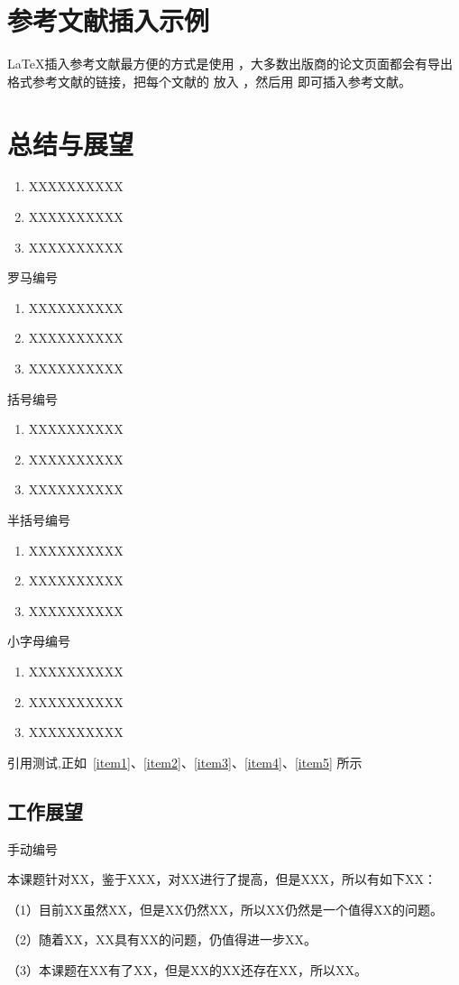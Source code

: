 \newpage

\section{参考文献插入示例}

\LaTeX \cite{lamport1994latex}插入参考文献最方便的方式是使用 \cite{pritchard1969statistical}，大多数出版商的论文页面都会有导出  格式参考文献的链接，把每个文献的  放入 ，然后用  即可插入参考文献。

\lipsum

\newpage


\section{总结与展望}

\begin{enumerate}
 \item XXXXXXXXXX
 \label{item1}
 \item XXXXXXXXXX
 \item XXXXXXXXXX
\end{enumerate}
罗马编号
\begin{enumerate}[label=(\roman*)]
 \item XXXXXXXXXX
 \label{item2}
 \item XXXXXXXXXX
 \item XXXXXXXXXX
\end{enumerate}
括号编号
\begin{enumerate}[label=(\arabic*)]
 \item XXXXXXXXXX
 \label{item3}
 \item XXXXXXXXXX
 \item XXXXXXXXXX
\end{enumerate}
半括号编号
\begin{enumerate}[label=\arabic*)]
 \item XXXXXXXXXX
 \label{item4}
 \item XXXXXXXXXX
 \item XXXXXXXXXX
\end{enumerate}
小字母编号
\begin{enumerate}[label=\alph*)]
 \item XXXXXXXXXX
 \label{item5}
 \item XXXXXXXXXX
 \item XXXXXXXXXX
\end{enumerate}

引用测试,正如~\ref{item1}、\ref{item2}、\ref{item3}、\ref{item4}、\ref{item5} 所示

\subsection{工作展望}
手动编号 %

本课题针对XX，鉴于XXX，对XX进行了提高，但是XXX，所以有如下XX：

（1）目前XX虽然XX，但是XX仍然XX，所以XX仍然是一个值得XX的问题。

（2）随着XX，XX具有XX的问题，仍值得进一步XX。

（3）本课题在XX有了XX，但是XX的XX还存在XX，所以XX。


\newpage
